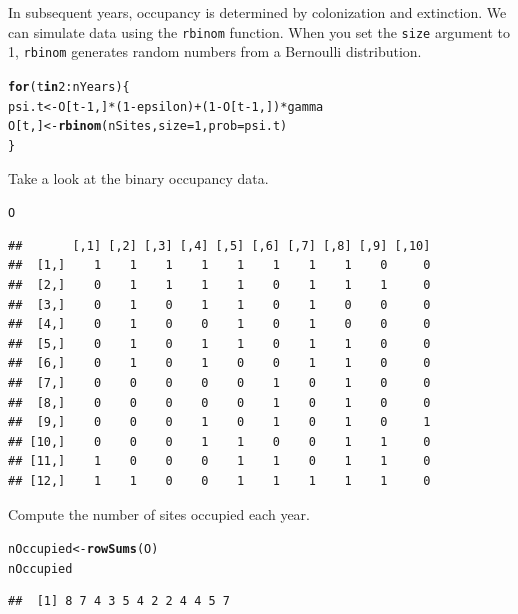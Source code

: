 \documentclass[12pt]{article}\usepackage[]{graphicx}\usepackage[]{xcolor}
\makeatletter
\newcommand{\hlnum}[1]{\textcolor[rgb]{0.686,0.059,0.569}{#1}}%
\newcommand{\hlopt}[1]{\textcolor[rgb]{0,0,0}{#1}}%
\newcommand{\hlstd}[1]{\textcolor[rgb]{0.345,0.345,0.345}{#1}}%
\newcommand{\hlkwa}[1]{\textcolor[rgb]{0.161,0.373,0.58}{\textbf{#1}}}%
\newcommand{\hlkwb}[1]{\textcolor[rgb]{0.69,0.353,0.396}{#1}}%
\newcommand{\hlkwc}[1]{\textcolor[rgb]{0.333,0.667,0.333}{#1}}%
\newcommand{\hlkwd}[1]{\textcolor[rgb]{0.737,0.353,0.396}{\textbf{#1}}}%
\newenvironment{kframe}{%
 \def\at@end@of@kframe{}%
 \ifinner\ifhmode%
  \def\at@end@of@kframe{\end{minipage}}%
  \begin{minipage}{\columnwidth}%
 \fi\fi%
 \def\FrameCommand##1{\hskip\@totalleftmargin \hskip-\fboxsep
 \colorbox{shadecolor}{##1}\hskip-\fboxsep
     \hskip-\linewidth \hskip-\@totalleftmargin \hskip\columnwidth}%
 \MakeFramed {\advance\hsize-\width
   \@totalleftmargin\z@ \linewidth\hsize
   \@setminipage}}%
 {\par\unskip\endMakeFramed%
 \at@end@of@kframe}
\newenvironment{knitrout}{}{} %
\makeatother
\begin{document}
In subsequent years, occupancy is determined by colonization and
extinction. We can simulate data using the {\tt rbinom}
function. When you set the {\tt size} argument to 1, {\tt rbinom}
generates random numbers from a Bernoulli distribution.
\begin{knitrout}
\color{fgcolor}\begin{kframe}
\begin{alltt}
\hlkwa{for}\hlstd{(t} \hlkwa{in} \hlnum{2}\hlopt{:}\hlstd{nYears) \{}
    \hlstd{psi.t} \hlkwb{<-} \hlstd{O[t}\hlopt{-}\hlnum{1}\hlstd{,]}\hlopt{*}\hlstd{(}\hlnum{1}\hlopt{-}\hlstd{epsilon)} \hlopt{+} \hlstd{(}\hlnum{1}\hlopt{-}\hlstd{O[t}\hlopt{-}\hlnum{1}\hlstd{,])}\hlopt{*}\hlstd{gamma}
    \hlstd{O[t,]} \hlkwb{<-} \hlkwd{rbinom}\hlstd{(nSites,} \hlkwc{size}\hlstd{=}\hlnum{1}\hlstd{,} \hlkwc{prob}\hlstd{=psi.t)}
\hlstd{\}}
\end{alltt}
\end{kframe}
\end{knitrout}

Take a look at the binary occupancy data.
\begin{knitrout}
\color{fgcolor}\begin{kframe}
\begin{alltt}
\hlstd{O}
\end{alltt}
\begin{verbatim}
##       [,1] [,2] [,3] [,4] [,5] [,6] [,7] [,8] [,9] [,10]
##  [1,]    1    1    1    1    1    1    1    1    0     0
##  [2,]    0    1    1    1    1    0    1    1    1     0
##  [3,]    0    1    0    1    1    0    1    0    0     0
##  [4,]    0    1    0    0    1    0    1    0    0     0
##  [5,]    0    1    0    1    1    0    1    1    0     0
##  [6,]    0    1    0    1    0    0    1    1    0     0
##  [7,]    0    0    0    0    0    1    0    1    0     0
##  [8,]    0    0    0    0    0    1    0    1    0     0
##  [9,]    0    0    0    1    0    1    0    1    0     1
## [10,]    0    0    0    1    1    0    0    1    1     0
## [11,]    1    0    0    0    1    1    0    1    1     0
## [12,]    1    1    0    0    1    1    1    1    1     0
\end{verbatim}
\end{kframe}
\end{knitrout}

Compute the number of sites occupied each year.
\begin{knitrout}
\color{fgcolor}\begin{kframe}
\begin{alltt}
\hlstd{nOccupied} \hlkwb{<-} \hlkwd{rowSums}\hlstd{(O)}
\hlstd{nOccupied}
\end{alltt}
\begin{verbatim}
##  [1] 8 7 4 3 5 4 2 2 4 4 5 7
\end{verbatim}
\end{kframe}
\end{knitrout}
\end{document}
